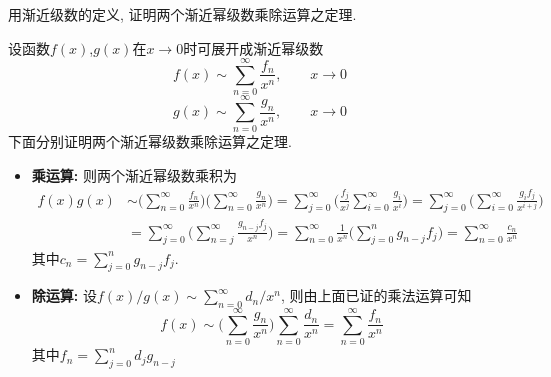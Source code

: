 \begin{problem}[习题1.5]
用渐近级数的定义, 证明两个渐近幂级数乘除运算之定理.
\end{problem}

\begin{solution}
设函数$f(x)$,$g(x)$在$x\rightarrow0$时可展开成渐近幂级数
\[
f(x)\sim\sum_{n=0}^{\infty}\frac{f_{n}}{x^{n}},\qquad x\rightarrow0
\]
\[
g(x)\sim\sum_{n=0}^{\infty}\frac{g_{n}}{x^{n}},\qquad x\rightarrow0
\]
下面分别证明两个渐近幂级数乘除运算之定理.
\begin{itemize}
\item\textbf{乘运算:} 则两个渐近幂级数乘积为
\begin{align*}
f(x)g(x) & \sim\bigg(\sum_{n=0}^{\infty}\frac{f_{n}}{x^{n}}\bigg)\bigg(\sum_{n=0}^{\infty}\frac{g_{n}}{x^{n}}\bigg)=\sum_{j=0}^{\infty}\bigg(\frac{f_{j}}{x^{j}}\sum_{i=0}^{\infty}\frac{g_{i}}{x^{i}}\bigg)=\sum_{j=0}^{\infty}\bigg(\sum_{i=0}^{\infty}\frac{g_{i}f_{j}}{x^{i+j}}\bigg)\\
 & =\sum_{j=0}^{\infty}\bigg(\sum_{n=j}^{\infty}\frac{g_{n-j}f_{j}}{x^{n}}\bigg)=\sum_{n=0}^{\infty}\frac{1}{x^{n}}\Big(\sum_{j=0}^{n}g_{n-j}f_{j}\Big)=\sum_{n=0}^{\infty}\frac{c_{n}}{x^{n}}
\end{align*}
其中$c_{n}=\sum_{j=0}^{n}g_{n-j}f_{j}$.
\item\textbf{除运算:} 设$f(x)/g(x)\sim\sum_{n=0}^{\infty}d_{n}/x^{n}$, 则由上面已证的乘法运算可知
\[
f(x)\sim\bigg(\sum_{n=0}^{\infty}\frac{g_{n}}{x^{n}}\bigg)\sum_{n=0}^{\infty}\frac{d_{n}}{x^{n}}=\sum_{n=0}^{\infty}\frac{f_{n}}{x^{n}}
\]
其中$f_{n}=\sum_{j=0}^{n}d_{j}g_{n-j}$
\end{itemize}
 

\end{solution}
